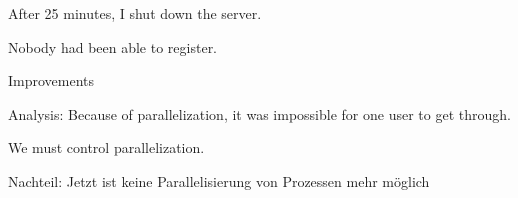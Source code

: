 \begin{frame}[fragile]{}

After 25 minutes, I shut down the server.
                  
                  Nobody had been able to register.
                  
\end{frame}

\begin{frame}[fragile]{}

{
\LARGE

Improvements
}

\end{frame}

\begin{frame}[fragile]{}

Analysis: Because of parallelization, it was impossible for one user to get through.
                  
                  We must control parallelization.
                  
\end{frame}

\begin{frame}[fragile]{}

Nachteil: Jetzt ist keine Parallelisierung von Prozessen mehr möglich

\end{frame}


